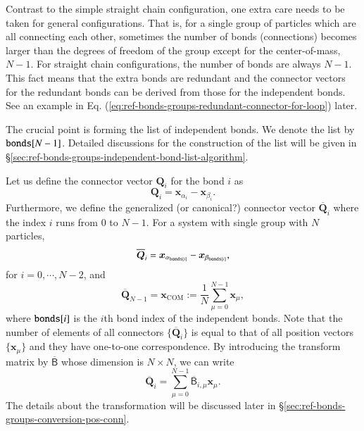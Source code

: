Contrast to the simple straight chain configuration, 
one extra care needs to be taken for general configurations. 
That is, for a single group of particles which are all connecting each other, 
sometimes the number of bonds (connections) becomes larger than 
the degrees of freedom of the group except for the center-of-mass, $N-1$. 
For straight chain configurations, the number of bonds are always $N-1$. 
This fact means that the extra bonds are redundant and 
the connector vectors for the redundant bonds can be 
derived from those for the independent bonds. 
See an example in Eq. (\ref{eq:ref-bonds-groups-redundant-connector-for-loop}) later.

The crucial point is forming the list of independent bonds. 
We denote the list by ${\tt bonds}[N-1]$. 
Detailed discussions for the construction of the list 
will be given in \S \ref{sec:ref-bonds-groups-independent-bond-list-algorithm}. 



Let us define the connector vector $\bm{Q}_{i}$ for the bond $i$ as 
\begin{equation}
  \bm{Q}_{i}
  =
  \bm{x}_{\alpha_{i}} - \bm{x}_{\beta_{i}}
  .
\end{equation}
Furthermore, we define the generalized (or canonical?) connector vector 
$\overline{\bm{Q}}_{i}$ where the index $i$ runs from $0$ to $N-1$. 
For a system with single group with $N$ particles, 
\begin{equation}
  \overline{\bm{Q}}_{i}
  =
  \bm{x}_{\alpha_{{\tt bonds}[i]}}
  -
  \bm{x}_{\beta_{{\tt bonds}[i]}}
  ,
\end{equation}
for $i = 0, \cdots, N-2$, and 
\begin{equation}
  \overline{\bm{Q}}_{N-1}
  =
  \bm{x}_{\text{COM}}
  :=
  \frac{1}{N}
  \sum_{\mu=0}^{N-1}
  \bm{x}_{\mu}
  ,
\end{equation}
where ${\tt bonds}[i]$ is the $i$th bond index 
of the independent bonds. 
Note that the number of elements of all connectors 
$\{\overline{\bm{Q}}_{i}\}$ 
is equal to that of all position vectors $\{\bm{x}_{\mu}\}$ 
and they have one-to-one correspondence. 
By introducing the transform matrix by $\overline{\mathsf{B}}$ 
whose dimension is $N\times N$, we can write 
\begin{equation}
  \overline{\bm{Q}}_{i}
  =
  \sum_{\mu=0}^{N-1}
  \overline{\mathsf{B}}_{i,\mu}
  \bm{x}_{\mu}
  .
  \label{eq:ref-bonds-groups-conversion-particle-wise}
\end{equation}
The details about the transformation will be discussed later 
in \S \ref{sec:ref-bonds-groups-conversion-pos-conn}. 



